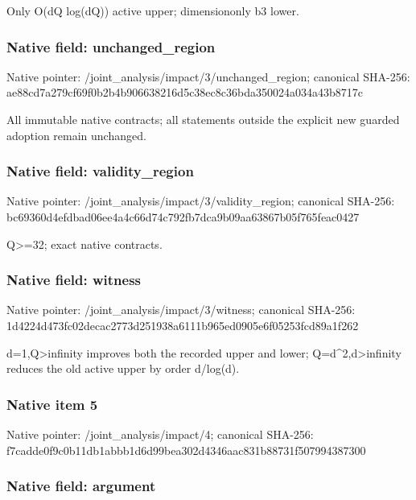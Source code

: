 \documentclass[10pt,a4paper]{article}
\begin{document}
Only O(dQ log(dQ)) active upper; dimensiononly b3 lower.


\subsubsection{Native field: unchanged\_region}


Native pointer: /joint\_analysis/impact/3\allowbreak{}/unchanged\_region; canonical SHA-256: ae88cd7a279cf69f0b2b4b90\allowbreak{}6638216d5c38ec8c36bda350\allowbreak{}024a034a43b8717c


All immutable native contracts; all statements outside the explicit new guarded adoption remain unchanged.


\subsubsection{Native field: validity\_region}


Native pointer: /joint\_analysis/impact/3\allowbreak{}/validity\_region; canonical SHA-256: bc69360d4efdbad06ee4a4c6\allowbreak{}6d74c792fb7dca9b09aa6386\allowbreak{}7b05f765feac0427


Q>=32; exact native contracts.


\subsubsection{Native field: witness}


Native pointer: /joint\_analysis/impact/3/witness; canonical SHA-256: 1d4224d473fc02decac2773d\allowbreak{}251938a6111b965ed0905e6f\allowbreak{}05253fcd89a1f262


d=1,Q>infinity improves both the recorded upper and lower; Q=d\textasciicircum{}2,d>infinity reduces the old active upper by order d/log(d).


\subsubsection{Native item 5}


Native pointer: /joint\_analysis/impact/4; canonical SHA-256: f7cadde0f9c0b11db1abbb1d\allowbreak{}6d99bea302d4346aac831b88\allowbreak{}731f507994387300



\subsubsection{Native field: argument}
\end{document}

